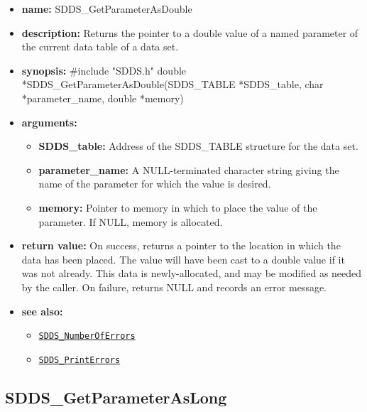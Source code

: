 \documentclass[11pt]{article}
\newcommand{\progref}[1]{\hyperref[SDDS_#1]{\tt SDDS\_#1}}
\begin{document}
\begin{itemize}
\item {\bf name:}\newline
SDDS\_GetParameterAsDouble
\item {\bf description:}\newline
Returns the pointer to a double value of a named parameter of the current data table of a data set.
\item {\bf synopsis:} \#include "SDDS.h"\newline
double *SDDS\_GetParameterAsDouble(SDDS\_TABLE *SDDS\_table, char *parameter\_name, double *memory)
\item {\bf arguments:}
\begin{itemize}
\item {\bf SDDS\_table:} Address of the SDDS\_TABLE structure for the data set.
\item {\bf parameter\_name:} A NULL-terminated character string giving the name of the parameter for which the value is desired.
\item {\bf memory:} Pointer to memory in which to place the value of the parameter. If NULL, memory is allocated.
\end{itemize}
\item {\bf return value:}\newline
On success, returns a pointer to the location in which the data has been placed. The value will have been cast to a double value if it was not already. This data is newly-allocated, and may be modified as needed by the caller. On failure, returns NULL and records an error message.
\item {\bf see also:}
\begin{itemize}
\item \progref{NumberOfErrors}
\item \progref{PrintErrors}
\end{itemize}
\end{itemize}

\subsection{SDDS\_GetParameterAsLong}
\label{SDDS_GetParameterAsLong}
\end{document}
